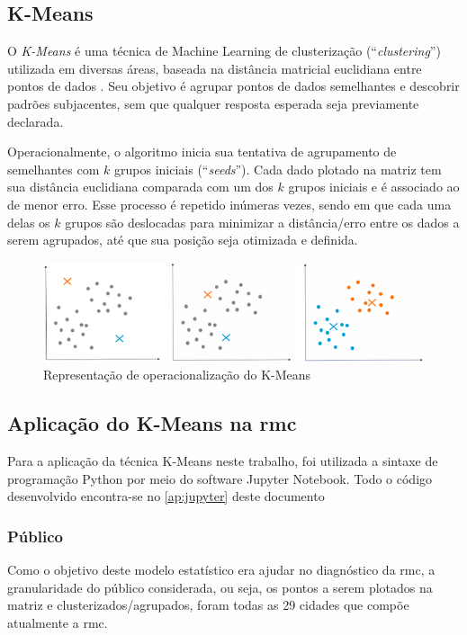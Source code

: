 	\subsection{K-Means}
	
	O \textit{K-Means} é uma técnica de Machine Learning de clusterização (``\textit{clustering}'') utilizada em diversas áreas, baseada na distância matricial euclidiana entre pontos de dados \cite{hartigan1979a}. Seu objetivo é agrupar pontos de dados semelhantes e descobrir padrões subjacentes, sem que qualquer resposta esperada seja previamente declarada.
	
	Operacionalmente, o algoritmo inicia sua tentativa de agrupamento de semelhantes com $k$ grupos iniciais (``\textit{seeds}''). Cada dado plotado na matriz tem sua distância euclidiana comparada com um dos $k$ grupos iniciais e é associado ao de menor erro. Esse processo é repetido inúmeras vezes, sendo em que cada uma delas os $k$ grupos são deslocadas para minimizar a distância/erro entre os dados a serem agrupados, até que sua posição seja otimizada e definida. 

	\begin{figure}
		\centering
		\caption{Representação de operacionalização do K-Means}
		\label{fig:kmeans}
		\includegraphics[width=1\linewidth]{img/machine_A}
	\end{figure}

	\subsection{Aplicação do K-Means na \gls{rmc}}
	
	Para a aplicação da técnica K-Means neste trabalho, foi utilizada a sintaxe de programação Python por meio do software Jupyter Notebook. Todo o código desenvolvido encontra-se no \autoref{ap:jupyter} deste documento
	
	\subsubsection{Público}
	
	Como o objetivo deste modelo estatístico era ajudar no diagnóstico da \glsdesc{rmc}, a granularidade do público considerada, ou seja, os pontos a serem plotados na matriz e clusterizados/agrupados, foram todas as 29 cidades que compõe atualmente a \gls{rmc}.
	
